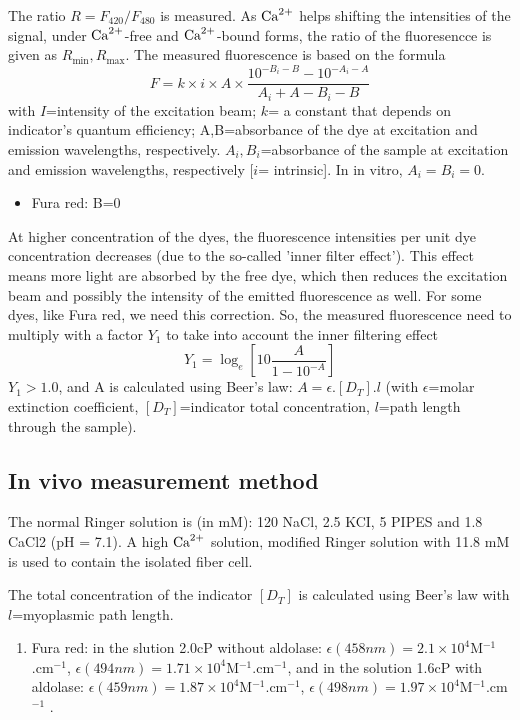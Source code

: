 The ratio $R=F_{420}/F_{480}$ is measured. As ${\text{Ca}^{2+}}$ helps shifting the
intensities of the signal, under ${\text{Ca}^{2+}}$-free and ${\text{Ca}^{2+}}$-bound forms, the ratio of
the fluoresencce is given as $R_\min, R_\max$. The measured fluorescence is
based on the formula \citep{kurebayashi1993}
\begin{equation}
F = k \times i \times A \times \frac{10^{-B_i-B}-10^{-A_i-A}}{A_i+A-B_i-B}
\end{equation}
with $I$=intensity of the excitation beam; $k$= a constant that depends on
indicator's quantum efficiency; A,B=absorbance of the dye at excitation
and emission wavelengths, respectively. $A_i,B_i$=absorbance of the sample at excitation
and emission wavelengths, respectively [$i$= intrinsic].  In in vitro,
$A_i=B_i=0$.
\begin{itemize}
  \item Fura red: B=0
\end{itemize}

At higher concentration of the dyes, the fluorescence intensities per unit dye
concentration decreases (due to the so-called 'inner filter effect'). This
effect means more light are absorbed by the free dye, which then reduces the
excitation beam and possibly the intensity of the emitted fluorescence as well.
For some dyes, like Fura red, we need this correction. So, the measured
fluorescence need to multiply with a factor $Y_1$ to take into account the inner
filtering effect
\begin{equation}
Y_1 = \log_e \left[ 10\frac{A}{1-10^{-A}} \right]
\end{equation}
$Y_1>1.0$, and A is calculated using Beer's law: $A=\epsilon . [D_T].l$ (with
$\epsilon$=molar extinction coefficient, $[D_T]$=indicator total concentration,
$l$=path length through the sample).


\subsection{In vivo measurement method}
\label{sec:in_vivo_measure_Fluo}

The normal Ringer solution is (in mM): 120 NaCl, 2.5 KCI, 5 PIPES and 1.8 CaCl2
(pH = 7.1). A high ${\text{Ca}^{2+}}$ solution, modified Ringer solution with 11.8 mM
 is used to contain the isolated fiber cell.


The total concentration of the indicator $[D_T]$ is calculated using Beer's law
with $l$=myoplasmic path length.
\begin{enumerate}
  \item Fura red: in the slution 2.0cP without
  aldolase: $\epsilon(458nm)=2.1\times 10^4$M$^{-1}$.cm$^{-1}$,
  $\epsilon(494nm)=1.71\times 10^4$M$^{-1}$.cm$^{-1}$, and in the solution 1.6cP
  with aldolase:  $\epsilon(459nm)=1.87\times 10^4$M$^{-1}$.cm$^{-1}$,
  $\epsilon(498nm)=1.97\times 10^4$M$^{-1}$.cm$^{-1}$ \citep{kurebayashi1993}.
\end{enumerate}

